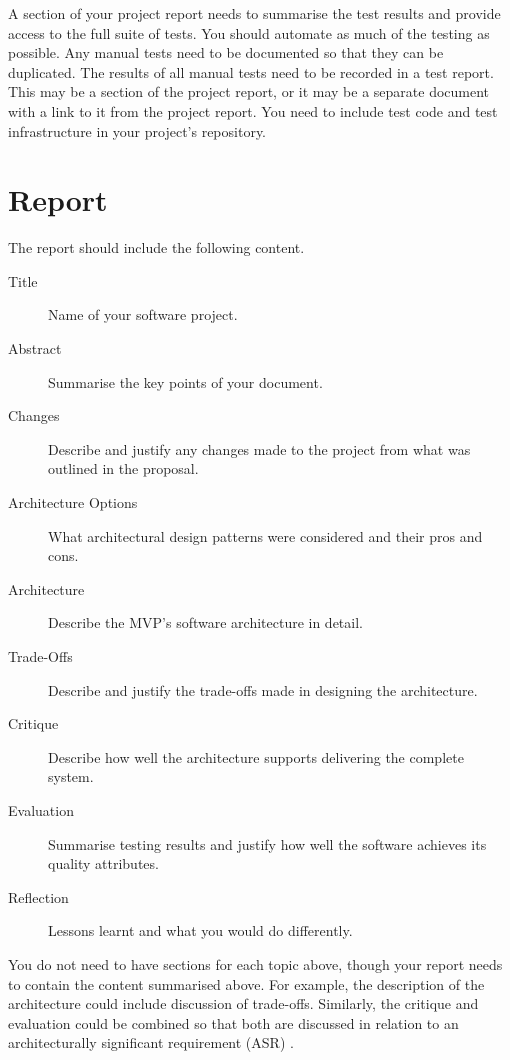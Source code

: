 \documentclass{csse4400}
\begin{document}
A section of your project report needs to summarise the test results and provide access to the full suite of tests.
You should automate as much of the testing as possible.
Any manual tests need to be documented so that they can be duplicated.
The results of all manual tests need to be recorded in a test report.
This may be a section of the project report, or it may be a separate document with a link to it from the project report.
You need to include test code and test infrastructure in your project's repository.


\section{Report}
The report should include the following content.

\begin{description}
    \item[Title] Name of your software project.
    \item[Abstract] Summarise the key points of your document.
    \item[Changes] Describe and justify any changes made to the project from what was outlined in the proposal.
    \item[Architecture Options] What architectural design patterns were considered and their pros and cons.
    \item[Architecture] Describe the MVP's software architecture in detail.
    \item[Trade-Offs] Describe and justify the trade-offs made in designing the architecture.
    \item[Critique] Describe how well the architecture supports delivering the complete system.
    \item[Evaluation] Summarise testing results and justify how well the software achieves its quality attributes.
    \item[Reflection] Lessons learnt and what you would do differently.
\end{description}


You do not need to have sections for each topic above, though your report needs to contain the content summarised above.
For example, the description of the architecture could include discussion of trade-offs.
Similarly, the critique and evaluation could be combined so that both are discussed in relation to an architecturally significant requirement (ASR) \cite{view-notes}.
\end{document}
